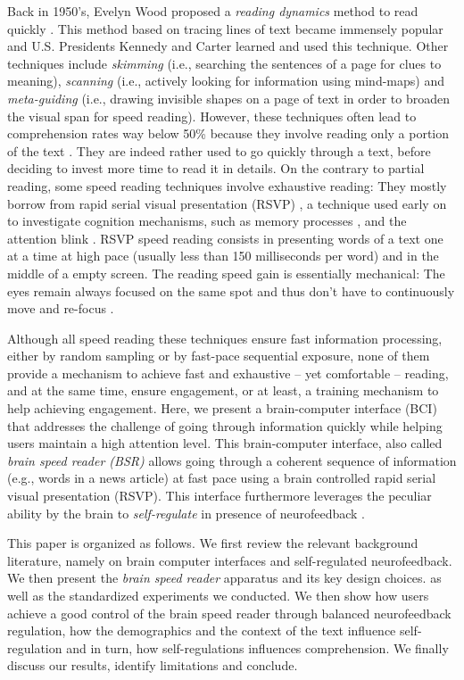 Back in 1950's, Evelyn Wood proposed a {\it reading dynamics} method to read quickly  \cite{frank1994evelyn}. This method  based on tracing lines of text became immensely popular and U.S. Presidents Kennedy and Carter learned and used this technique. Other techniques include {\it skimming} (i.e., searching the sentences of a page for clues to meaning), {\it scanning} (i.e.,  actively looking for information using mind-maps) and {\it meta-guiding} (i.e., drawing invisible shapes on a page of text in order to broaden the visual span for speed reading). However, these techniques often lead to comprehension rates way below 50\% because they involve reading only a portion of the text \cite{carver1992reading}. They are indeed rather used to go quickly through a text, before deciding to invest more time to read it in details. On the contrary to partial reading, some speed reading techniques involve exhaustive reading: They mostly borrow from rapid serial visual presentation (RSVP) \cite{potter1984rapid}, a technique used early on to investigate cognition mechanisms, such as memory processes \cite{potter1999understanding}, and the attention blink \cite{shapiro1994attention}. RSVP speed reading consists in presenting words of a text one at a time at high pace (usually less than 150 milliseconds per word) and in the middle of a empty screen. The reading speed gain is essentially mechanical: The eyes remain always focused on the same spot and thus don't have to continuously move and re-focus \cite{slate2014}.

Although all speed reading these techniques ensure fast information processing, either by random sampling or by fast-pace sequential exposure, none of them provide a mechanism to achieve fast and exhaustive -- yet comfortable -- reading, and at the same time, ensure engagement, or at least, a training mechanism to help achieving engagement. Here, we present a brain-computer interface (BCI) that addresses the challenge of going through information quickly while helping users maintain a high attention level. This brain-computer interface, also called {\it brain speed reader (BSR)}  allows going through a coherent sequence of information (e.g., words in a news article) at fast pace using a brain controlled rapid serial visual presentation (RSVP). This interface furthermore leverages the peculiar ability by the brain to {\it self-regulate} in presence of neurofeedback \cite{lubar1976eeg,weiskopf2004self}.

This paper is organized as follows. We first review the relevant background literature, namely on brain computer interfaces and self-regulated neurofeedback. We then present the {\it brain speed reader} apparatus and its key design choices. as well as the standardized experiments we conducted. We then show how users achieve a good control of the brain speed reader through balanced neurofeedback regulation, how the demographics and the context of the text influence self-regulation and in turn, how self-regulations influences comprehension. We finally discuss our results, identify limitations and conclude.





